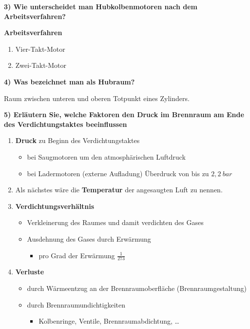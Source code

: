 \textbf{3) Wie unterscheidet man Hubkolbenmotoren nach dem
Arbeitsverfahren?}

\textbf{Arbeitsverfahren}

\begin{enumerate}
\def\labelenumi{(\arabic{enumi})}
\item
  Vier-Takt-Motor
\item
  Zwei-Takt-Motor
\end{enumerate}

\textbf{4) Was bezeichnet man als Hubraum?}

Raum zwischen unteren und oberen Totpunkt eines Zylinders.

\textbf{5) Erläutern Sie, welche Faktoren den Druck im Brennraum am Ende
des Verdichtungstaktes beeinflussen}

\begin{enumerate}
\def\labelenumi{(\arabic{enumi})}
\item
  \textbf{Druck} zu Beginn des Verdichtungstaktes

  \begin{itemize}
  \item
    bei Saugmotoren um den atmosphärischen Luftdruck
  \item
    bei Ladermotoren (externe Aufladung) Überdruck von bis zu
    $2,2~bar$
  \end{itemize}
\item
  Als nächstes wäre die \textbf{Temperatur} der angesaugten Luft zu
  nennen.
\item
  \textbf{Verdichtungsverhältnis}

  \begin{itemize}
  \item
    Verkleinerung des Raumes und damit verdichten des Gases
  \item
    Ausdehnung des Gases durch Erwärmung

    \begin{itemize}
    \item
      pro Grad der Erwärmung $\frac{1}{273}$
    \end{itemize}
  \end{itemize}
\item
  \textbf{Verluste}

  \begin{itemize}
  \item
    durch Wärmeentzug an der Brennraumoberfläche (Brennraumgestaltung)
  \item
    durch Brennraumundichtigkeiten

    \begin{itemize}
    \item
      Kolbenringe, Ventile, Brennraumabdichtung, \ldots{}
    \end{itemize}
  \end{itemize}
\end{enumerate}

